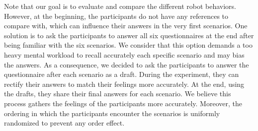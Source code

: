 Note that our goal is to evaluate and compare the different robot behaviors. However, at the beginning, the participants do not have any references to compare with, which can influence their answers in the very first scenarios. One solution is to ask the participants to answer all six questionnaires at the end after being familiar with the six scenarios. We consider that this option demands a too heavy mental workload to recall accurately each specific scenario and may bias the answers. As a consequence, we decided to ask the participants to answer the questionnaire after each scenario as a draft. During the experiment, they can rectify their answers to match their feelings more accurately. At the end, using the drafts, they share their final answers for each scenario. We believe this process gathers the feelings of the participants more accurately. Moreover, the ordering in which the participants encounter the scenarios is uniformly randomized to prevent any order effect. 


